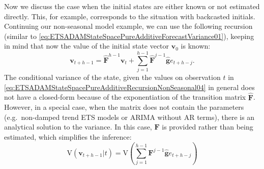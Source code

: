 \documentclass[
]{book}
\theoremstyle{definition}
\theoremstyle{definition}
\theoremstyle{definition}
\theoremstyle{definition}
\theoremstyle{remark}
\begin{document}
Now we discuss the case when the initial states are either known or not estimated directly. This, for example, corresponds to the situation with backcasted initials. Continuing our non-seasonal model example, we can use the following recursion (similar to \eqref{eq:ETSADAMStateSpacePureAdditiveForecastVariance01}), keeping in mind that now the value of the initial state vector \(\mathbf{v}_0\) is known:
\begin{equation}
    \mathbf{v}_{t+h-1} = \hat{\mathbf{F}}^{h-1} \mathbf{v}_{t} + \sum_{j=1}^{h-1} \hat{\mathbf{F}}^{j-1} \hat{\mathbf{g}} e_{t+h-j} .
  \label{eq:ETSADAMStateSpacePureAdditiveRecursionNonSeasonal04}
\end{equation}
The conditional variance of the state, given the values on observation \(t\) in \eqref{eq:ETSADAMStateSpacePureAdditiveRecursionNonSeasonal04} in general does not have a closed-form because of the exponentiation of the transition matrix \(\hat{\mathbf{F}}\). However, in a special case, when the matrix does not contain the parameters (e.g.~non-damped trend ETS models or ARIMA without AR terms), there is an analytical solution to the variance. In this case, \(\mathbf{F}\) is provided rather than being estimated, which simplifies the inference:
\begin{equation}
    \mathrm{V}(\mathbf{v}_{t+h-1} | t) = \mathrm{V}\left(\sum_{j=1}^{h-1} \mathbf{F}^{j-1} \hat{\mathbf{g}} e_{t+h-j}\right)
  \label{eq:ETSADAMStateSpacePureAdditiveVariance01}
\end{equation}
\end{document}
